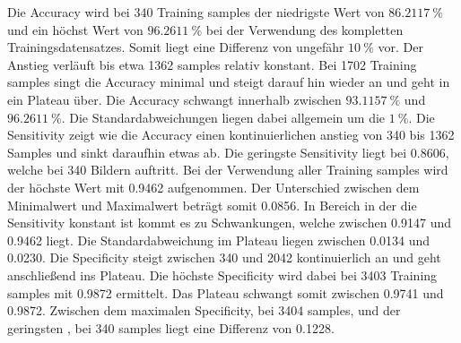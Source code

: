 Die Accuracy wird bei 340 Training samples der niedrigste Wert von $\qty{86.2117}{\%}$  und ein höchst Wert von $\qty{96.2611}{\%}$ bei der Verwendung des kompletten Trainingsdatensatzes.
Somit liegt eine Differenz von ungefähr $\qty{10}{\%}$ vor.
Der Anstieg verläuft bis etwa 1362 samples relativ konstant. 
Bei 1702 Training samples singt die Accuracy minimal und steigt darauf hin wieder an und geht in ein Plateau über.
Die Accuracy schwangt innerhalb zwischen $\qty{93.1157}{\%}$ und $\qty{96.2611}{\%}$. 
Die Standardabweichungen liegen dabei allgemein um die $\qty{1}{\%}$.
Die Sensitivity zeigt wie die Accuracy einen kontinuierlichen anstieg von 340 bis 1362 Samples und sinkt daraufhin etwas ab.  
Die geringste Sensitivity liegt bei 0.8606, welche bei 340 Bildern auftritt. 
Bei der Verwendung aller Training samples wird der höchste Wert mit 0.9462 aufgenommen.
Der Unterschied zwischen dem Minimalwert und Maximalwert beträgt somit 0.0856.
In Bereich in der die Sensitivity konstant ist kommt es zu Schwankungen, welche zwischen 0.9147 und 0.9462 liegt.
Die Standardabweichung im Plateau liegen zwischen 0.0134 und 0.0230.
Die Specificity steigt zwischen 340 und 2042 kontinuierlich an und geht anschließend ins Plateau.
Die höchste Specificity wird dabei bei 3403 Training samples mit 0.9872 ermittelt. 
Das Plateau schwangt somit zwischen 0.9741 und 0.9872. 
Zwischen dem maximalen Specificity, bei 3404 samples, und der geringsten , bei 340 samples liegt eine Differenz von 0.1228.

